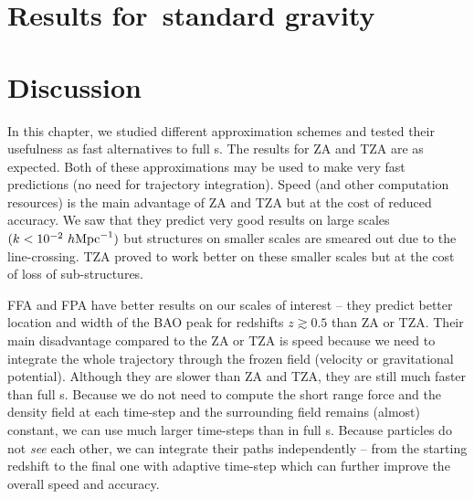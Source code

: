 % 
% 

\section{Results for~standard gravity}








\section{Discussion}
\label{sec:disc}
In this chapter, we studied different approximation schemes and tested their usefulness as fast alternatives to full \nbodysim s. The results for ZA and TZA are as expected. Both of these approximations may be used to make very fast predictions (no need for trajectory integration). Speed (and other computation resources) is the main advantage of ZA and TZA but at the cost of reduced accuracy. We saw that they predict very good results on large scales $(k<10^{-2}~h\text{Mpc}^{-1})$ but structures on smaller scales are smeared out due to the line-crossing. TZA proved to work better on these smaller scales but at the cost of loss of sub-structures.

FFA and FPA have better results on our scales of interest -- they predict better location and width of the BAO peak for redshifts $z\gtrsim0.5$ than ZA or TZA. Their main disadvantage compared to the ZA or TZA is speed because we need to integrate the whole trajectory through the frozen field (velocity or gravitational potential). Although they are slower than ZA and TZA, they are still much faster than full \nbodysim s. Because we do not need to compute the short range force and the density field at each time-step and the surrounding field remains (almost) constant, we can use much larger time-steps than in full \nbodysim s. Because particles do not \textit{see} each other, we can integrate their paths independently -- from the starting redshift to the final one with adaptive time-step which can further improve the overall speed and accuracy.

